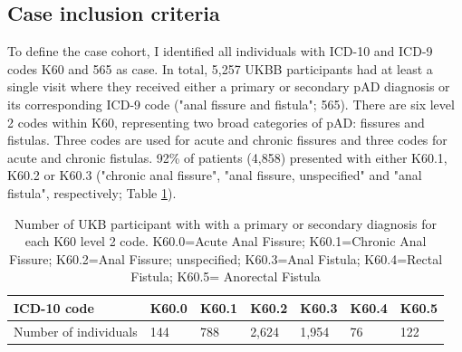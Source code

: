 \subsection{Case inclusion criteria}
To define the case cohort, I identified all individuals with ICD-10 and ICD-9 codes K60
and 565 as case. In total, 5,257 UKBB participants had at least a single visit where they received either a primary or secondary pAD diagnosis or its corresponding ICD-9 code ("anal fissure and fistula"; 565). There are six level 2 codes within K60, representing two broad categories of pAD: fissures and fistulas. Three codes are used for acute and chronic fissures and three codes for acute and chronic fistulas. 92\% of patients (4,858) presented with either K60.1, K60.2 or K60.3 ("chronic anal fissure", "anal fissure, unspecified" and "anal fistula", respectively; Table \ref{table:ukbb_level2_nums}).



\begin{table}[H]
  \centering
  \caption{Number of UKB participant with with a primary or secondary diagnosis for each K60 level 2 code. K60.0=Acute Anal Fissure; K60.1=Chronic Anal Fissure; K60.2=Anal Fissure; unspecified; K60.3=Anal Fistula; K60.4=Rectal Fistula; K60.5= Anorectal Fistula}
  \label{table:ukbb_level2_nums}
  \begin{tabular}{|l|l|l|l|l|l|l|}
  \hline
  ICD-10 code           & K60.0  & K60.1  & K60.2  & K60.3 & K60.4 & K60.5\\ \hline
  Number of individuals & 144                      & 788                        & 2,624                           & 1,954              & 76                   & 122                     \\ \hline
  \end{tabular}
  \end{table}




